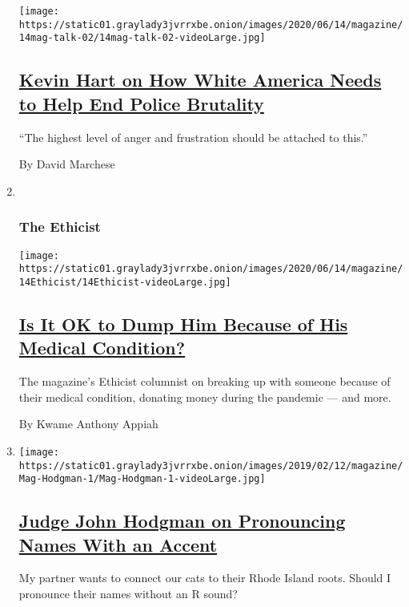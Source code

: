 \begin{enumerate}
  \texttt{[image: https://static01.graylady3jvrrxbe.onion/images/2020/06/14/magazine/14mag-talk-02/14mag-talk-02-videoLarge.jpg]}

  \hypertarget{kevin-hart-on-how-white-america-needs-to-help-end-police-brutality}{%
  \subsection{\texorpdfstring{\href{/interactive/2020/06/08/magazine/kevin-hart-police-brutality.html}{Kevin
  Hart on How White America Needs to Help End Police
  Brutality}}{Kevin Hart on How White America Needs to Help End Police Brutality}}\label{kevin-hart-on-how-white-america-needs-to-help-end-police-brutality}}

  ``The highest level of anger and frustration should be attached to
  this.''

  By David Marchese
\item ~
  \hypertarget{the-ethicist}{%
  \subsubsection{The Ethicist}\label{the-ethicist}}

  \texttt{[image: https://static01.graylady3jvrrxbe.onion/images/2020/06/14/magazine/14Ethicist/14Ethicist-videoLarge.jpg]}

  \hypertarget{is-it-ok-to-dump-him-because-of-his-medical-condition}{%
  \subsection{\texorpdfstring{\href{/2020/06/09/magazine/is-it-ok-to-dump-him-because-of-his-medical-condition.html}{Is
  It OK to Dump Him Because of His Medical
  Condition?}}{Is It OK to Dump Him Because of His Medical Condition?}}\label{is-it-ok-to-dump-him-because-of-his-medical-condition}}

  The magazine's Ethicist columnist on breaking up with someone because
  of their medical condition, donating money during the pandemic --- and
  more.

  By Kwame Anthony Appiah
\item
  \texttt{[image: https://static01.graylady3jvrrxbe.onion/images/2019/02/12/magazine/Mag-Hodgman-1/Mag-Hodgman-1-videoLarge.jpg]}

  \hypertarget{judge-john-hodgman-on-pronouncing-names-with-an-accent}{%
  \subsection{\texorpdfstring{\href{/2020/06/11/magazine/judge-john-hodgman-on-pronouncing-names-with-an-accent.html}{Judge
  John Hodgman on Pronouncing Names With an
  Accent}}{Judge John Hodgman on Pronouncing Names With an Accent}}\label{judge-john-hodgman-on-pronouncing-names-with-an-accent}}

  My partner wants to connect our cats to their Rhode Island roots.
  Should I pronounce their names without an R sound?
\end{enumerate}

